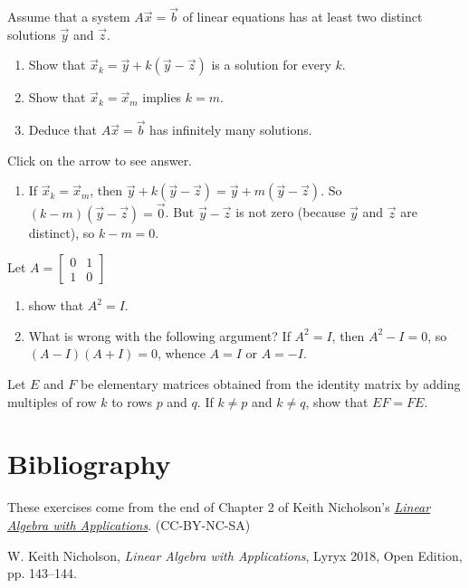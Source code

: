 \documentclass{ximera}
\begin{document}
\begin{problem}\label{prob:4.78}
Assume that a system $A\vec{x} = \vec{b}$ of linear equations has at least two distinct solutions $\vec{y}$ and $\vec{z}$.

\begin{enumerate}
\item Show that $\vec{x}_{k} = \vec{y} + k(\vec{y} - \vec{z})$ is a solution for every $k$.

\item Show that $\vec{x}_{k} = \vec{x}_{m}$ implies $k = m$. 

\item Deduce that $A\vec{x} = \vec{b}$ has infinitely many solutions.

\end{enumerate}

Click on the arrow to see answer.
\begin{expandable}
\begin{enumerate}
\item  If $\vec{x}_{k} = \vec{x}_{m}$, then $\vec{y} + k(\vec{y} - \vec{z}) = \vec{y} + m(\vec{y} - \vec{z})$. So $(k - m)(\vec{y} - \vec{z}) = \vec{0}$. But $\vec{y} - \vec{z}$ is not zero (because $\vec{y}$ and $\vec{z}$ are distinct), so $k - m = 0$.
\end{enumerate}
\end{expandable}
\end{problem}

\begin{problem}\label{prob:4.81}
Let $A = \left[ \begin{array}{rr}
0 & 1 \\
1 & 0
\end{array} \right]$
\begin{enumerate}
\item 
 show that $A^{2} = I$.
\item What is wrong with the following argument? If $A^{2} = I$, then $A^{2} - I = 0$, so $(A - I)(A + I) = 0$, whence $A = I$ or $A = -I$.
\end{enumerate}
\end{problem}

\begin{problem}\label{prob:4.82}
Let $E$ and $F$ be elementary matrices obtained from the identity matrix by adding multiples of row $k$ to rows $p$ and $q$. If $k \neq p$ and $k \neq q$, show that $EF = FE$.

\end{problem}



\section*{Bibliography}
These exercises come from the end of Chapter 2 of Keith Nicholson's \href{https://open.umn.edu/opentextbooks/textbooks/linear-algebra-with-applications}{\it Linear Algebra with Applications}. (CC-BY-NC-SA)

W. Keith Nicholson, {\it Linear Algebra with Applications}, Lyryx 2018, Open Edition, pp. 143--144. 
\end{document}
